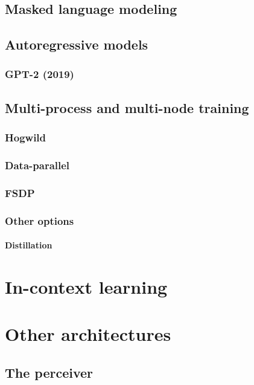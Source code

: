 \documentclass{pca}
\theoremstyle{theorem}
\theoremstyle{definition}
\theoremstyle{proof}
\begin{document}

\section{Masked language modeling}

\section{Autoregressive models}

\subsection{GPT-2 (2019)}

\section{Multi-process and multi-node training}

\subsection{Hogwild}

\subsection{Data-parallel}

\subsection{FSDP}

\subsection{Other options}

\subsubsection{Distillation}

\chapter{In-context learning}

\chapter{Other architectures}

\section{The perceiver}
\end{document}

